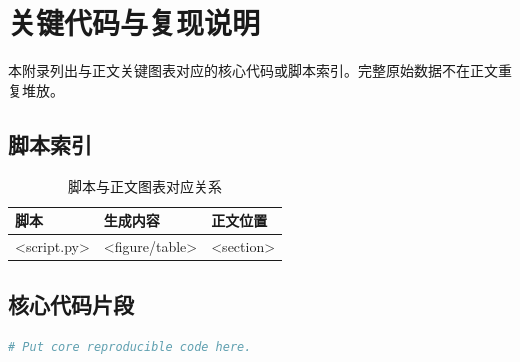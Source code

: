 \documentclass{ctexart}
\begin{document}
\appendix
\section{关键代码与复现说明}

本附录列出与正文关键图表对应的核心代码或脚本索引。完整原始数据不在正文重复堆放。

\subsection{脚本索引}
\begin{table}[H]
  \centering
  \caption{脚本与正文图表对应关系}
  \begin{tabular}{lll}
    \toprule
    脚本 & 生成内容 & 正文位置 \\
    \midrule
    <script.py> & <figure/table> & <section> \\
    \bottomrule
  \end{tabular}
\end{table}

\subsection{核心代码片段}
\begin{lstlisting}[language=Python]
# Put core reproducible code here.
\end{lstlisting}
\end{document}
